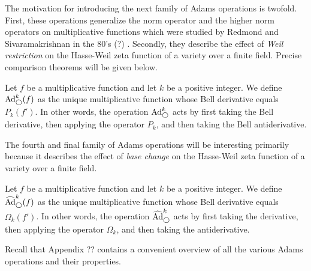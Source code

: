 The motivation for introducing the next family of Adams operations is twofold. First, these operations generalize the norm operator and the higher norm operators on multiplicative functions which were studied by Redmond and Sivaramakrishnan in the 80's (?) \cite{}. Secondly, they describe the effect of \emph{Weil restriction} on the Hasse-Weil zeta function of a variety over a finite field. Precise comparison theorems will be given below.


\begin{definition}
Let $f$ be a multiplicative function and let $k$ be a positive integer. We define $\text{Ad}^{k}_{\bigcirc}(f)$ as the unique multiplicative function whose Bell derivative equals $P_k(f')$. In other words, the operation $\text{Ad}^{k}_{\bigcirc}$ acts by first taking the Bell derivative, then applying the operator $P_k$, and then taking the Bell antiderivative.

\end{definition}

The fourth and final family of Adams operations will be interesting primarily because it describes the effect of \emph{base change} on the Hasse-Weil zeta function of a variety over a finite field.

\begin{definition}
Let $f$ be a multiplicative function and let $k$ be a positive integer. We define $\widehat{\text{Ad}}^{k}_{\bigcirc}(f)$ as the unique multiplicative function whose Bell derivative equals $\Omega_k(f')$. In other words, the operation $\widehat{\text{Ad}}^{k}_{\bigcirc}$ acts by first taking the derivative, then applying the operator $\Omega_k$, and then taking the antiderivative.

\end{definition}

Recall that Appendix ?? contains a convenient overview of all the various Adams operations and their properties.


